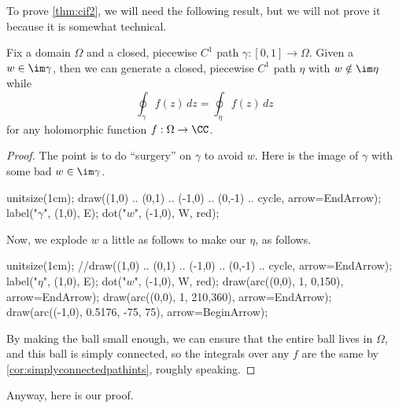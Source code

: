 To prove \autoref{thm:cif2}, we will need the following result, but we will not prove it because it is somewhat technical.
\begin{proposition} \label{prop:surgery}
	Fix a domain $\Omega$ and a closed, piecewise $C^1$ path $\gamma:[0,1]\to\Omega$. Given a $w\in\im\gamma$, then we can generate a closed, piecewise $C^1$ path $\eta$ with $w\notin\im\eta$ while
	\[\oint_\gamma f(z)\,dz=\oint_\eta f(z)\,dz\]
	for any holomorphic function $f:\Omega\to\CC$.
\end{proposition}
\begin{proof}
	The point is to do ``surgery'' on $\gamma$ to avoid $w$. Here is the image of $\gamma$ with some bad $w\in\im\gamma$.
	\begin{center}
		\begin{asy}
			unitsize(1cm);
			draw((1,0) .. (0,1) .. (-1,0) .. (0,-1) .. cycle, arrow=EndArrow);
			label("$\gamma$", (1,0), E);
			dot("$w$", (-1,0), W, red);
		\end{asy}
	\end{center}
	Now, we explode $w$ a little as follows to make our $\eta$, as follows.
	\begin{center}
		\begin{asy}
			unitsize(1cm);
			//draw((1,0) .. (0,1) .. (-1,0) .. (0,-1) .. cycle, arrow=EndArrow);
			label("$\eta$", (1,0), E);
			dot("$w$", (-1,0), W, red);
			draw(arc((0,0), 1, 0,150), arrow=EndArrow);
			draw(arc((0,0), 1, 210,360), arrow=EndArrow);
			draw(arc((-1,0), 0.5176, -75, 75), arrow=BeginArrow);
		\end{asy}
	\end{center}
	By making the ball small enough, we can ensure that the entire ball lives in $\Omega$, and this ball is simply connected, so the integrals over any $f$ are the same by \autoref{cor:simplyconnectedpathints}, roughly speaking.
\end{proof}
Anyway, here is our proof.
